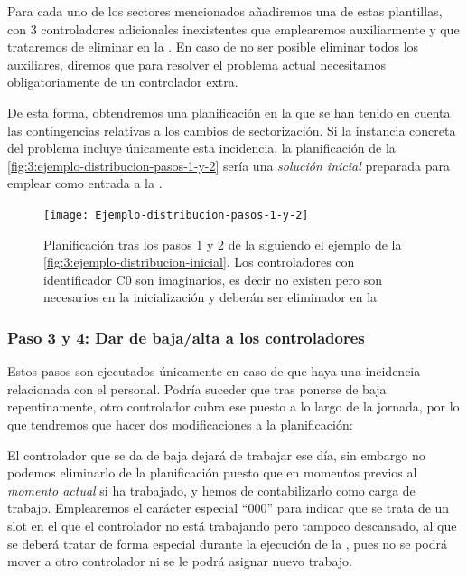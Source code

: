 Para cada uno de los sectores mencionados añadiremos una de estas plantillas, con 3 controladores adicionales inexistentes que emplearemos auxiliarmente y que trataremos de eliminar en la \fasedos{}. En caso de no ser posible eliminar todos los auxiliares, diremos que para resolver el problema actual necesitamos obligatoriamente de un controlador extra.

De esta forma, obtendremos una planificación en la que se han tenido en cuenta las contingencias relativas a los cambios de sectorización. Si la instancia concreta del problema incluye únicamente esta incidencia, la planificación de la \autoref{fig:3:ejemplo-distribucion-pasos-1-y-2} sería una \textit{solución inicial} preparada para emplear como entrada a la \fasedos{}.

\begin{figure}[htbp]
	\centering
	\texttt{[image: Ejemplo-distribucion-pasos-1-y-2]}
	\caption[Planificación tras los pasos 1 y 2 de la Fase 1]{Planificación tras los pasos 1 y 2 de la \faseuno{} siguiendo el ejemplo de la \autoref{fig:3:ejemplo-distribucion-inicial}. Los controladores con identificador C0 son imaginarios, es decir no existen pero son necesarios en la inicialización y deberán ser eliminador en la \fasedos{}} 
	\label{fig:3:ejemplo-distribucion-pasos-1-y-2}
\end{figure}

\subsubsection{Paso 3 y 4: Dar de baja/alta a los controladores}
\label{sec:baja-alta-controladores}

Estos pasos son ejecutados únicamente en caso de que haya una incidencia relacionada con el personal. Podría suceder que tras ponerse de baja repentinamente, otro controlador cubra ese puesto a lo largo de la jornada, por lo que tendremos que hacer dos modificaciones a la planificación:

El controlador que se da de baja dejará de trabajar ese día, sin embargo no podemos eliminarlo de la planificación puesto que en momentos previos al \textit{momento actual} si ha trabajado, y hemos de contabilizarlo como carga de trabajo. Emplearemos el carácter especial ``000'' para indicar que se trata de un slot en el que el controlador no está trabajando pero tampoco descansado, al que se deberá tratar de forma especial durante la ejecución de la \fasedos{}, pues no se podrá mover a otro controlador ni se le podrá asignar nuevo trabajo. 

